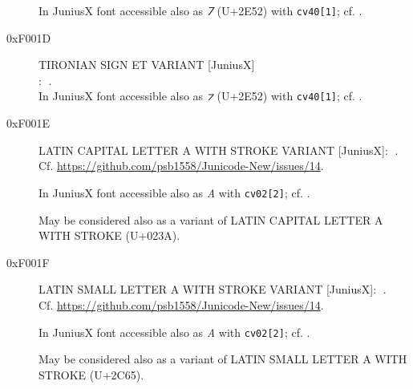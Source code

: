 \documentclass{article}
\newcommand{\Jglyph}[1]{{\relsize{2}\J#1}}
\begin{document}
\begin{description}
In JuniusX font accessible also as \textit{⹒} (U+2E52) with \texttt{cv40[1]};
  cf. \autocite[p. 12]{baker20:_opent_featur_junius_junius}.

\item [0xF001D] TIRONIAN SIGN ET VARIANT [JuniusX]\\:
  \Jglyph{󰀝}.\\%
  In JuniusX font accessible also as \textit{⁊} (U+2E52) with \texttt{cv40[1]};
  cf. \autocite[p. 12]{baker20:_opent_featur_junius_junius}.

\item[0xF001E] LATIN CAPITAL LETTER A WITH STROKE
  VARIANT [JuniusX]: \Jglyph{󰀞}.\\
  Cf. \url{https://github.com/psb1558/Junicode-New/issues/14}.
  
  In JuniusX font accessible also as \textit{A} with \texttt{cv02[2]};
  cf. \autocite[p. 7]{baker20:_opent_featur_junius_junius}.
% 

    May be considered also as a variant of LATIN CAPITAL LETTER A WITH
  STROKE (U+023A).

  
\item [0xF001F] LATIN SMALL LETTER A WITH STROKE  VARIANT [JuniusX]: 
  \Jglyph{󰀟}.\\ Cf. \url{https://github.com/psb1558/Junicode-New/issues/14}.

  In JuniusX font accessible also as \textit{A} with \texttt{cv02[2]};
  cf. \autocite[p. 7]{baker20:_opent_featur_junius_junius}.

  May be considered also as a variant of LATIN SMALL LETTER A WITH
  STROKE (U+2C65).

\end{description}

\printbibliography
\end{document}
